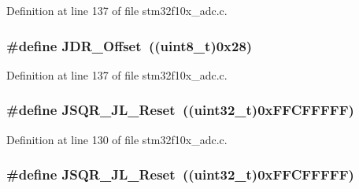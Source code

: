 Definition at line 137 of file stm32f10x\+\_\+adc.\+c.

\subsubsection[{\texorpdfstring{J\+D\+R\+\_\+\+Offset}{JDR_Offset}}]{\setlength{\rightskip}{0pt plus 5cm}\#define J\+D\+R\+\_\+\+Offset~(({\bf uint8\+\_\+t})0x28)}\hypertarget{group___a_d_c___private___defines_ga5671a68d6f0d01c6c465ee7a3a8f3eea}{}\label{group___a_d_c___private___defines_ga5671a68d6f0d01c6c465ee7a3a8f3eea}


Definition at line 137 of file stm32f10x\+\_\+adc.\+c.

\subsubsection[{\texorpdfstring{J\+S\+Q\+R\+\_\+\+J\+L\+\_\+\+Reset}{JSQR_JL_Reset}}]{\setlength{\rightskip}{0pt plus 5cm}\#define J\+S\+Q\+R\+\_\+\+J\+L\+\_\+\+Reset~(({\bf uint32\+\_\+t})0x\+F\+F\+C\+F\+F\+F\+F\+F)}\hypertarget{group___a_d_c___private___defines_gac8d1173791ea10bac7c53a368d593a16}{}\label{group___a_d_c___private___defines_gac8d1173791ea10bac7c53a368d593a16}


Definition at line 130 of file stm32f10x\+\_\+adc.\+c.

\subsubsection[{\texorpdfstring{J\+S\+Q\+R\+\_\+\+J\+L\+\_\+\+Reset}{JSQR_JL_Reset}}]{\setlength{\rightskip}{0pt plus 5cm}\#define J\+S\+Q\+R\+\_\+\+J\+L\+\_\+\+Reset~(({\bf uint32\+\_\+t})0x\+F\+F\+C\+F\+F\+F\+F\+F)}\hypertarget{group___a_d_c___private___defines_gac8d1173791ea10bac7c53a368d593a16}{}\label{group___a_d_c___private___defines_gac8d1173791ea10bac7c53a368d593a16}


